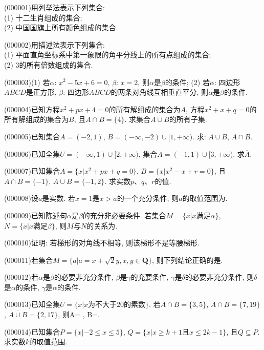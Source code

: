 \item (000001)用列举法表示下列集合:\\
(1) 十二生肖组成的集合;\\
(2) 中国国旗上所有颜色组成的集合.
\item (000002)用描述法表示下列集合:\\
(1) 平面直角坐标系中第一象限的角平分线上的所有点组成的集合;\\
(2) $3$的所有倍数组成的集合.
\item (000003)(1) 若$\alpha$: $x^2-5x+6=0$, $\beta$: $x=2$, 则$\alpha$是$\beta$的条件;
(2) 若$\alpha$: 四边形$ABCD$是正方形, $\beta$: 四边形$ABCD$的两条对角线互相垂直平分, 则$\alpha$是$\beta$的条件.
\item (000004)已知方程$x^2+px+4=0$的所有解组成的集合为$A$, 方程$x^2+x+q=0$的所有解组成的集合为$B$, 且$A\cap B=\{4\}$. 求集合$A\cup B$的所有子集.
\item (000005)已知集合$A=(-2, 1)$, $B=(-\infty, -2)\cup [1, +\infty)$. 求: $A\cup B$, $A\cap B$.
\item (000006)已知全集$U=(-\infty, 1)\cup [2, +\infty)$, 集合$A=(-1, 1)\cup [3, +\infty)$. 求$\overline{A}$.
\item (000007)已知集合$A=\{x|x^2+px+q=0\}$, $B=\{x|x^2-x+r=0\}$, 且$A\cap B=\{-1\}$, $A\cup B=\{-1, 2\}$. 求实数$p$、$q$、$r$的值.
\item (000008)设$a$是实数. 若$x=1$是$x>a$的一个充分条件, 则$a$的取值范围为.
\item (000009)已知陈述句$\alpha$是$\beta$的充分非必要条件. 若集合$M=\{x|x\text{满足}\alpha\}$, $N=\{x|x\text{满足}\beta\}$, 则$M$与$N$的关系为.
\item (000010)证明: 若梯形的对角线不相等, 则该梯形不是等腰梯形.
\item (000011)若集合$M=\{a|a=x+\sqrt2y, x,y\in \mathbf{Q}\}$, 则下列结论正确的是.
\item (000012)若$\alpha$是$\beta$的必要非充分条件, $\beta$是$\gamma$的充要条件, $\gamma$是$\delta$的必要非充分条件, 则$\delta$是$\alpha$的条件, $\gamma$是$\alpha$的条件.
\item (000013)已知全集$U=\{x|x\text{为不大于}20\text{的素数}\}$. 若$A\cap \overline{B}=\{3, 5\}$, $\overline{A}\cap B=\{7, 19\}$, $\overline{A\cup B}=\{2, 17\}$, 则A= , B=.
\item (000014)已知集合$P=\{x|-2\le x\le 5\}$, $Q=\{x|x\ge k+1\text{且}x\le 2k-1\}$, 且$Q\subseteq P$. 求实数$k$的取值范围.
